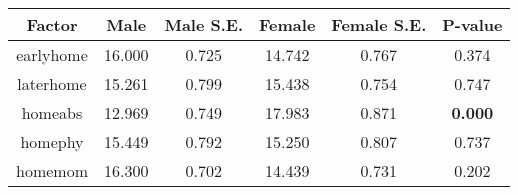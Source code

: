 \begin{longtable}{c c c c c c}
\toprule
\textbf{Factor} & \textbf{Male} & \textbf{Male S.E.}  & \textbf{Female} & \textbf{Female S.E.} & \textbf{P-value} \\
\midrule
earlyhome & 16.000 & 0.725 &  14.742 & 0.767 & 0.374 \\
laterhome & 15.261 & 0.799 &  15.438 & 0.754 & 0.747 \\
homeabs & 12.969 & 0.749 &  17.983 & 0.871 & \textbf{0.000} \\
homephy & 15.449 & 0.792 &  15.250 & 0.807 & 0.737 \\
homemom & 16.300 & 0.702 &  14.439 & 0.731 & 0.202 \\
\bottomrule
\end{longtable}
